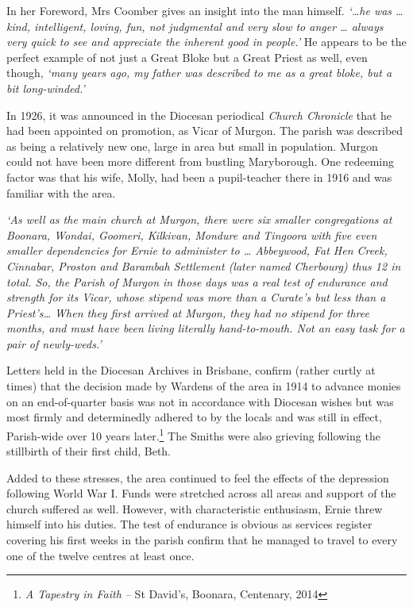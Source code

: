 In her Foreword, Mrs Coomber gives an insight into the man himself. \emph{`\ldots he was \ldots{} kind, intelligent, loving, fun, not judgmental and very slow to anger \ldots{} always very quick to see and appreciate the inherent good in people.'} He appears to be the perfect example of not just a Great Bloke but a Great Priest as well, even though, \emph{`many years ago, my father was described to me as a great bloke, but a bit long-winded.'}



In 1926, it was announced in the Diocesan periodical \emph{Church Chronicle} that he had been appointed on promotion, as Vicar of Murgon. The parish was described as being a relatively new one, large in area but small in population. Murgon could not have been more different from bustling Maryborough. One redeeming factor was that his wife, Molly, had been a pupil-teacher there in 1916 and was familiar with the area.



\emph{`As well as the main church at Murgon, there were six smaller congregations at Boonara, Wondai, Goomeri, Kilkivan, Mondure and Tingoora with five even smaller dependencies for Ernie to administer to \ldots{} Abbeywood, Fat Hen Creek, Cinnabar, Proston and Barambah Settlement (later named Cherbourg) thus 12 in total. So, the Parish of Murgon in those days was a real test of endurance and strength for its Vicar, whose stipend was more than a Curate's but less than a Priest's\ldots{} When they first arrived at Murgon, they had no stipend for three months, and must have been living literally hand-to-mouth. Not an easy task for a pair of newly-weds.'}



Letters held in the Diocesan Archives in Brisbane, confirm (rather curtly at times) that the decision made by Wardens of the area in 1914 to advance monies on an end-of-quarter basis was not in accordance with Diocesan wishes but was most firmly and determinedly adhered to by the locals and was still in effect, Parish-wide over 10 years later.\footnote{\emph{A Tapestry in Faith --} St David's, Boonara, Centenary, 2014} The Smiths were also grieving following the stillbirth of their first child, Beth.


Added to these stresses, the area continued to feel the effects of the depression following World War I. Funds were stretched across all areas and support of the church suffered as well. However, with characteristic enthusiasm, Ernie threw himself into his duties. The test of endurance is obvious as services register covering his first weeks in the parish confirm that he managed to travel to every one of the twelve centres at least once.



